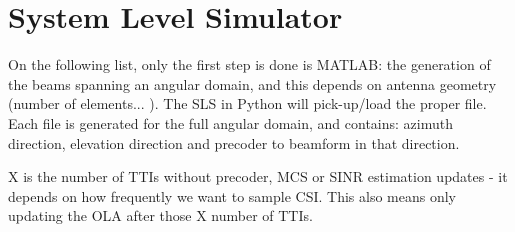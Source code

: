 \section{System Level Simulator}
\label{sec:sls}





On the following list, only the first step is done is MATLAB: the generation of the beams spanning an angular domain, and this depends on antenna geometry (number of elements... ). The SLS in Python will pick-up/load the proper file. Each file is generated for the full angular domain, and contains: azimuth direction, elevation direction and precoder to beamform in that direction.


 X is the number of TTIs without precoder, MCS or SINR estimation updates - it depends on how frequently we want to sample CSI. This also means only updating the OLA after those X number of TTIs.


